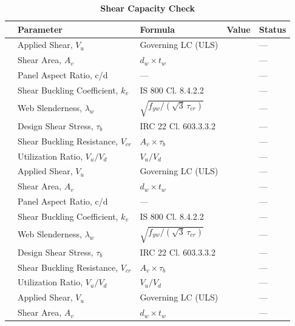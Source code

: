 \documentclass[12pt,a4paper]{report}
\numberwithin{table}{chapter}
\numberwithin{figure}{chapter}
\begin{document}
\vspace{1em}
\begin{longtable}{|C{2.5cm}|C{3.5cm}|C{3.5cm}|>{\centering\arraybackslash}p{4.2cm}|C{1.8cm}|}
\caption{\textbf{Shear Capacity Check}} \\
\hline
\textbf{} & \textbf{Parameter} & \textbf{Formula} & \textbf{Value} & \textbf{Status} \\[6pt]
\hline
{} & Applied Shear, $V_u$ & Governing LC (ULS) &  & --- \\[6pt]
 & Shear Area, $A_v$ & $d_w \times t_w$ &  & --- \\[6pt]
 & Panel Aspect Ratio, c/d & --- &  & --- \\[6pt]
 & Shear Buckling Coefficient, $k_v$ & IS 800 Cl. 8.4.2.2 &  & --- \\[6pt]
 & Web Slenderness, $\lambda_w$ & $\sqrt{f_{yw}/(\sqrt{3}\,\tau_{cr})}$ &  & --- \\[6pt]
 & Design Shear Stress, $\tau_b$ & IRC 22 Cl. 603.3.3.2 &  & --- \\[6pt]
 & Shear Buckling Resistance, $V_{cr}$ & $A_v \times \tau_b$ &  & --- \\[6pt]
 & Utilization Ratio, $V_u / V_d$ & $V_u / V_d$ &  & --- \\[6pt]
\hline
{} & Applied Shear, $V_u$ & Governing LC (ULS) &  & --- \\[6pt]
 & Shear Area, $A_v$ & $d_w \times t_w$ &  & --- \\[6pt]
 & Panel Aspect Ratio, c/d & --- &  & --- \\[6pt]
 & Shear Buckling Coefficient, $k_v$ & IS 800 Cl. 8.4.2.2 &  & --- \\[6pt]
 & Web Slenderness, $\lambda_w$ & $\sqrt{f_{yw}/(\sqrt{3}\,\tau_{cr})}$ &  & --- \\[6pt]
 & Design Shear Stress, $\tau_b$ & IRC 22 Cl. 603.3.3.2 &  & --- \\[6pt]
 & Shear Buckling Resistance, $V_{cr}$ & $A_v \times \tau_b$ &  & --- \\[6pt]
 & Utilization Ratio, $V_u / V_d$ & $V_u / V_d$ &  & --- \\[6pt]
\hline
{} & Applied Shear, $V_u$ & Governing LC (ULS) &  & --- \\[6pt]
 & Shear Area, $A_v$ & $d_w \times t_w$ &  & --- \\[6pt]

\end{longtable}
\end{document}
